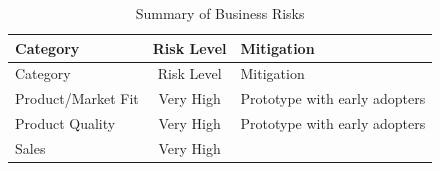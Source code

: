\documentclass[11pt,openany]{book}
\begin{document}
\begin{longtable}[]{@{}lcl@{}}
\caption{Summary of Business Risks}\tabularnewline
\toprule
\begin{minipage}[b]{0.26\columnwidth}\raggedright
Category\strut
\end{minipage} & \begin{minipage}[b]{0.16\columnwidth}\centering
Risk Level\strut
\end{minipage} & \begin{minipage}[b]{0.49\columnwidth}\raggedright
Mitigation\strut
\end{minipage}\tabularnewline
\midrule
\endfirsthead
\toprule
\begin{minipage}[b]{0.26\columnwidth}\raggedright
Category\strut
\end{minipage} & \begin{minipage}[b]{0.16\columnwidth}\centering
Risk Level\strut
\end{minipage} & \begin{minipage}[b]{0.49\columnwidth}\raggedright
Mitigation\strut
\end{minipage}\tabularnewline
\midrule
\endhead
\begin{minipage}[t]{0.26\columnwidth}\raggedright
Product/Market Fit\strut
\end{minipage} & \begin{minipage}[t]{0.16\columnwidth}\centering
Very High\strut
\end{minipage} & \begin{minipage}[t]{0.49\columnwidth}\raggedright
Prototype with early adopters\strut
\end{minipage}\tabularnewline
\begin{minipage}[t]{0.26\columnwidth}\raggedright
Product Quality\strut
\end{minipage} & \begin{minipage}[t]{0.16\columnwidth}\centering
Very High\strut
\end{minipage} & \begin{minipage}[t]{0.49\columnwidth}\raggedright
Prototype with early adopters\strut
\end{minipage}\tabularnewline
\begin{minipage}[t]{0.26\columnwidth}\raggedright
Sales\strut
\end{minipage} & \begin{minipage}[t]{0.16\columnwidth}\centering
Very High\strut
\end{minipage} & \begin{minipage}[t]{0.49\columnwidth}\raggedright

\end{minipage}
\end{longtable}
\end{document}
